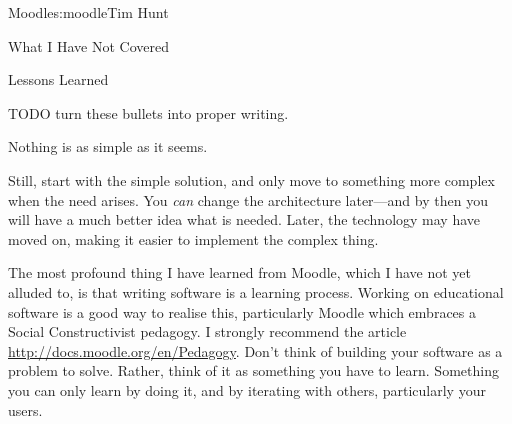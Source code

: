 \begin{aosachapter}{Moodle}{s:moodle}{Tim Hunt}
\begin{aosasect1}{What I Have Not Covered}
\end{aosasect1}

\begin{aosasect1}{Lessons Learned}

TODO turn these bullets into proper writing.

\begin{aosaitemize}

\item Nothing is as simple as it seems.

\item Still, start with the simple solution, and only move to
  something more complex when the need arises. You \emph{can} change
  the architecture later---and by then you will have a much better
  idea what is needed. Later, the technology may have moved on, making
  it easier to implement the complex thing.

\item The most profound thing I have learned from Moodle, which I have
  not yet alluded to, is that writing software is a learning
  process. Working on educational software is a good way to realise
  this, particularly Moodle which embraces a Social Constructivist
  pedagogy. I strongly recommend the article
  \url{http://docs.moodle.org/en/Pedagogy}. Don't think of building
  your software as a problem to solve. Rather, think of it as
  something you have to learn. Something you can only learn by doing
  it, and by iterating with others, particularly your users.

\end{aosaitemize}

\end{aosasect1}

\end{aosachapter}
